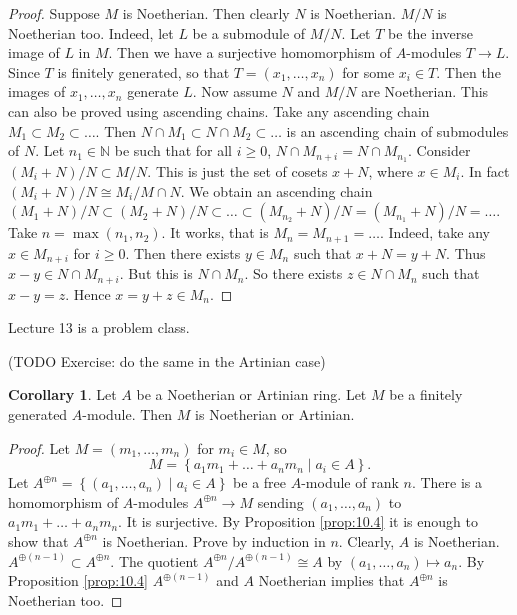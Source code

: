 \documentclass{article}
\newcommand{\N}{\mathbb{N}}
\newcommand{\rb}[1]{\left( #1 \right)}
\newcommand{\cb}[1]{\left\{ #1 \right\}}
\theoremstyle{definition}\newtheorem{definition}{Definition}[section]
\theoremstyle{definition}\newtheorem{remark}[definition]{Remark}
\theoremstyle{definition}\newtheorem*{example}{Example}
\theoremstyle{definition}\newtheorem*{note}{Note}
\newtheorem{corollary}[definition]{Corollary}
\begin{document}
\begin{proof}
Suppose $ M $ is Noetherian. Then clearly $ N $ is Noetherian. $ M / N $ is Noetherian too. Indeed, let $ L $ be a submodule of $ M / N $. Let $ T $ be the inverse image of $ L $ in $ M $. Then we have a surjective homomorphism of $ A $-modules $ T \to L $. Since $ T $ is finitely generated, so that $ T = \rb{x_1, \dots, x_n} $ for some $ x_i \in T $. Then the images of $ x_1, \dots, x_n $ generate $ L $. Now assume $ N $ and $ M / N $ are Noetherian. This can also be proved using ascending chains. Take any ascending chain $ M_1 \subset M_2 \subset \dots $. Then $ N \cap M_1 \subset N \cap M_2 \subset \dots $ is an ascending chain of submodules of $ N $. Let $ n_1 \in \N $ be such that for all $ i \ge 0 $, $ N \cap M_{n + i} = N \cap M_{n_1} $. Consider $ \rb{M_i + N} / N \subset M / N $. This is just the set of cosets $ x + N $, where $ x \in M_i $. In fact $ \rb{M_i + N} / N \cong M_i / M \cap N $. We obtain an ascending chain $ \rb{M_1 + N} / N \subset \rb{M_2 + N} / N \subset \dots \subset \rb{M_{n_2} + N} / N = \rb{M_{n_1} + N} / N = \dots $. Take $ n = \max\rb{n_1, n_2} $. It works, that is $ M_n = M_{n + 1} = \dots $. Indeed, take any $ x \in M_{n + i} $ for $ i \ge 0 $. Then there exists $ y \in M_n $ such that $ x + N = y + N $. Thus $ x - y \in N \cap M_{n + i} $. But this is $ N \cap M_n $. So there exists $ z \in N \cap M_n $ such that $ x - y = z $. Hence $ x = y + z \in M_n $.
\end{proof}


Lecture 13 is a problem class.


(TODO Exercise: do the same in the Artinian case)

\begin{corollary}
Let $ A $ be a Noetherian or Artinian ring. Let $ M $ be a finitely generated $ A $-module. Then $ M $ is Noetherian or Artinian.
\end{corollary}

\begin{proof}
Let $ M = \rb{m_1, \dots, m_n} $ for $ m_i \in M $, so
$$ M = \cb{a_1m_1 + \dots + a_nm_n \mid a_i \in A}. $$
Let $ A^{\oplus n} = \cb{\rb{a_1, \dots, a_n} \mid a_i \in A} $ be a free $ A $-module of rank $ n $. There is a homomorphism of $ A $-modules $ A^{\oplus n} \to M $ sending $ \rb{a_1, \dots, a_n} $ to $ a_1m_1 + \dots + a_nm_n $. It is surjective. By Proposition \ref{prop:10.4} it is enough to show that $ A^{\oplus n} $ is Noetherian. Prove by induction in $ n $. Clearly, $ A $ is Noetherian. $ A^{\oplus \rb{n - 1}} \subset A^{\oplus n} $. The quotient $ A^{\oplus n} / A^{\oplus \rb{n - 1}} \cong A $ by $ \rb{a_1, \dots, a_n} \mapsto a_n $. By Proposition \ref{prop:10.4} $ A^{\oplus \rb{n - 1}} $ and $ A $ Noetherian implies that $ A^{\oplus n} $ is Noetherian too.
\end{proof}
\end{document}
